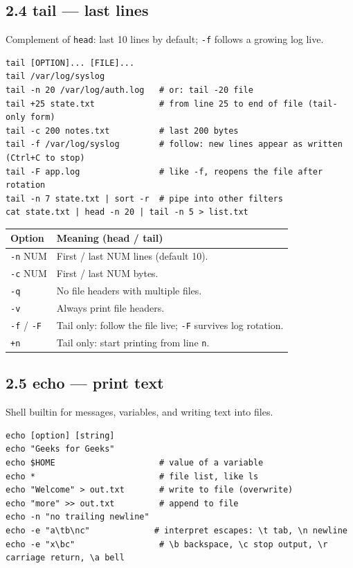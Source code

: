 \documentclass[11pt,a4paper]{article}
\newcommand{\cmd}[1]{\texttt{#1}}
\begin{document}
\subsection{2.4 tail --- last lines}
Complement of \cmd{head}: last 10 lines by default; \cmd{-f} follows a growing log live.
\begin{lstlisting}
tail [OPTION]... [FILE]...
tail /var/log/syslog
tail -n 20 /var/log/auth.log   # or: tail -20 file
tail +25 state.txt             # from line 25 to end of file (tail-only form)
tail -c 200 notes.txt          # last 200 bytes
tail -f /var/log/syslog        # follow: new lines appear as written (Ctrl+C to stop)
tail -F app.log                # like -f, reopens the file after rotation
tail -n 7 state.txt | sort -r  # pipe into other filters
cat state.txt | head -n 20 | tail -n 5 > list.txt
\end{lstlisting}
\begin{center}
\small
\begin{tabularx}{\textwidth}{lX}
\toprule
Option & Meaning (head / tail) \\
\midrule
\cmd{-n} NUM & First / last NUM lines (default 10). \\
\cmd{-c} NUM & First / last NUM bytes. \\
\cmd{-q} & No file headers with multiple files. \\
\cmd{-v} & Always print file headers. \\
\cmd{-f} / \cmd{-F} & Tail only: follow the file live; \cmd{-F} survives log rotation. \\
\cmd{+n} & Tail only: start printing from line \cmd{n}. \\
\bottomrule
\end{tabularx}
\end{center}

\subsection{2.5 echo --- print text}
Shell builtin for messages, variables, and writing text into files.
\begin{lstlisting}
echo [option] [string]
echo "Geeks for Geeks"
echo $HOME                     # value of a variable
echo *                         # file list, like ls
echo "Welcome" > out.txt       # write to file (overwrite)
echo "more" >> out.txt         # append to file
echo -n "no trailing newline"
echo -e "a\tb\nc"             # interpret escapes: \t tab, \n newline
echo -e "x\bc"                 # \b backspace, \c stop output, \r carriage return, \a bell
\end{lstlisting}
\end{document}
